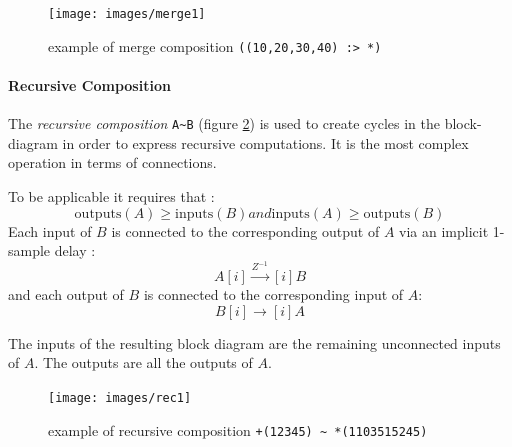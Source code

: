 \documentclass[a4paper,10pt]{book}
\begin{document}
\begin{figure}[h]
\centering 
\texttt{[image: images/merge1]} 
\caption{example of merge composition \lstinline'((10,20,30,40) :> *)'}  
\label{figure:merge1}
\end{figure}


\paragraph{Recursive Composition}
The \emph{recursive composition} \lstinline'A~B' (figure \ref{figure:rec1}) is used to create cycles in the block-diagram in order to express recursive computations. It is the most complex operation in terms of connections.

To be applicable it requires that :
\begin{equation}
\mathrm{outputs}(A) \geq \mathrm{inputs}(B) and \mathrm{inputs}(A) \geq \mathrm{outputs}(B)                                                                                               \end{equation}
Each input of $B$ is connected to the corresponding output of $A$ via an implicit 1-sample delay : 
\begin{equation}
A[i]\stackrel{Z^{-1}}{\rightarrow}[i]B
\end{equation} 
and each output of $B$ is connected to the corresponding input of $A$:
\begin{equation}
B[i]\rightarrow [i]A
\end{equation} 

The inputs of the resulting block diagram are the remaining unconnected inputs of $A$. The outputs are all the outputs of $A$.
 
\begin{figure}[h]
\centering 
\texttt{[image: images/rec1]} 
\caption{example of recursive composition \lstinline'+(12345) ~ *(1103515245)'}  
\label{figure:rec1}
\end{figure}






\end{document}
